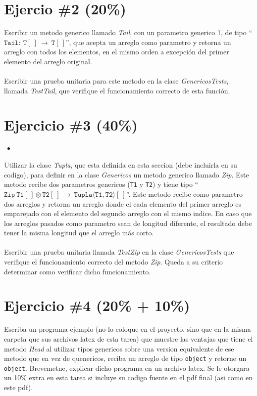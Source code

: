 \documentclass{article}
\newcommand{\perlscript}[2]{
\begin{itemize}
\item[]
\end{itemize}
}
\begin{document}
\section*{Ejercio \#2 (20\%)}
Escribir un metodo generico llamado \emph{Tail}, con un parametro generico \texttt{T},
de tipo ``$\mathtt{Tail}:\ \mathtt{T[\ ]}\ \rightarrow\ \mathtt{T[\ ]}$'', que acepta un arreglo
como parametro y retorna un arreglo con todos los elementos, en el mismo orden a excepci\'on
del primer elemento del arreglo original.
\\\\
Escribir una prueba unitaria para este metodo en la clase \emph{GenericosTests}, llamada
\emph{TestTail}, que verifique el funcionamiento correcto de esta funci\'on.

\section*{Ejercicio \#3 (40\%)}
\perlscript{Tupla}{}
Utilizar la clase \emph{Tupla}, que esta definida en esta seccion (debe incluirla
en su codigo), para definir en la clase \emph{Genericos} un metodo generico llamado \emph{Zip}. Este metodo recibe
dos parametros genericos (\texttt{T1} y \texttt{T2}) y tiene tipo ``$\mathtt{Zip}\ 
\mathtt{T1[\ ]}\otimes\mathtt{T2[\ ]}\ \rightarrow\ \mathtt{Tupla\langle T1,T2\rangle[\ ]}$''.
Este metodo recibe como parametro dos arreglos y retorna un arreglo donde el cada elemento
del primer arreglo es emparejado con el elemento del segundo arreglo con el mismo indice.
En caso que los arreglos pasados como parametro sean de longitud diferente, el resultado
debe tener la misma longitud que el arreglo m\'as corto.
\\\\
Escribir una prueba unitaria llanada \emph{TestZip} en la clase \emph{GenericosTests} que
verifique el funcionamiento correcto del metodo \emph{Zip}. Queda a su criterio determinar
como verificar dicho funcionamiento.

\section*{Ejercicio \#4 (20\% + 10\%)}
Escriba un programa ejemplo (no lo coloque en el proyecto, sino que en la misma carpeta
que sus archivos latex de esta tarea) que muestre las ventajas que tiene el metodo \emph{Head}
al utilizar tipos genericos sobre una version equivalente de ese metodo que en vez de
quenericos, reciba un arreglo de tipo \texttt{object} y retorne un \texttt{object}. Brevemetne,
explicar dicho programa en un archivo latex. Se le otorgara un 10\% extra en esta tarea si
incluye su codigo fuente en el pdf final (asi como en este pdf).
\end{document}

